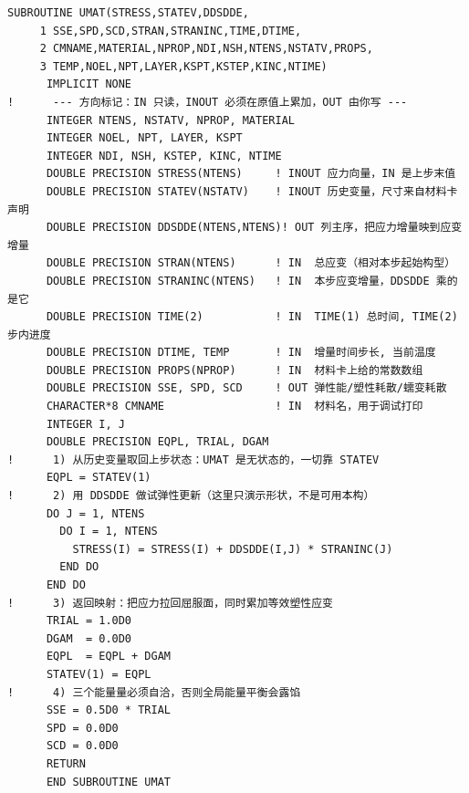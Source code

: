 \documentclass[12pt,a4paper,fontset=fandol]{ctexbook}
\begin{document}
\begin{lstlisting}[language={[95]Fortran}, style=fortranstyle, caption={UMAT 骨架：常引用形参与逐参数注释
（形参完整清单与顺序以官方用户子程序条目为准）}, label={lst:ch05-umat-skeleton}]
      SUBROUTINE UMAT(STRESS,STATEV,DDSDDE,
     1 SSE,SPD,SCD,STRAN,STRANINC,TIME,DTIME,
     2 CMNAME,MATERIAL,NPROP,NDI,NSH,NTENS,NSTATV,PROPS,
     3 TEMP,NOEL,NPT,LAYER,KSPT,KSTEP,KINC,NTIME)
      IMPLICIT NONE
!      --- 方向标记：IN 只读，INOUT 必须在原值上累加，OUT 由你写 ---
      INTEGER NTENS, NSTATV, NPROP, MATERIAL
      INTEGER NOEL, NPT, LAYER, KSPT
      INTEGER NDI, NSH, KSTEP, KINC, NTIME
      DOUBLE PRECISION STRESS(NTENS)     ! INOUT 应力向量，IN 是上步末值
      DOUBLE PRECISION STATEV(NSTATV)    ! INOUT 历史变量，尺寸来自材料卡声明
      DOUBLE PRECISION DDSDDE(NTENS,NTENS)! OUT 列主序，把应力增量映到应变增量
      DOUBLE PRECISION STRAN(NTENS)      ! IN  总应变（相对本步起始构型）
      DOUBLE PRECISION STRANINC(NTENS)   ! IN  本步应变增量，DDSDDE 乘的是它
      DOUBLE PRECISION TIME(2)           ! IN  TIME(1) 总时间, TIME(2) 步内进度
      DOUBLE PRECISION DTIME, TEMP       ! IN  增量时间步长, 当前温度
      DOUBLE PRECISION PROPS(NPROP)      ! IN  材料卡上给的常数数组
      DOUBLE PRECISION SSE, SPD, SCD     ! OUT 弹性能/塑性耗散/蠕变耗散
      CHARACTER*8 CMNAME                 ! IN  材料名，用于调试打印
      INTEGER I, J
      DOUBLE PRECISION EQPL, TRIAL, DGAM
!      1) 从历史变量取回上步状态：UMAT 是无状态的，一切靠 STATEV
      EQPL = STATEV(1)
!      2) 用 DDSDDE 做试弹性更新（这里只演示形状，不是可用本构）
      DO J = 1, NTENS
        DO I = 1, NTENS
          STRESS(I) = STRESS(I) + DDSDDE(I,J) * STRANINC(J)
        END DO
      END DO
!      3) 返回映射：把应力拉回屈服面，同时累加等效塑性应变
      TRIAL = 1.0D0
      DGAM  = 0.0D0
      EQPL  = EQPL + DGAM
      STATEV(1) = EQPL
!      4) 三个能量量必须自洽，否则全局能量平衡会露馅
      SSE = 0.5D0 * TRIAL
      SPD = 0.0D0
      SCD = 0.0D0
      RETURN
      END SUBROUTINE UMAT
\end{lstlisting}
\end{document}
